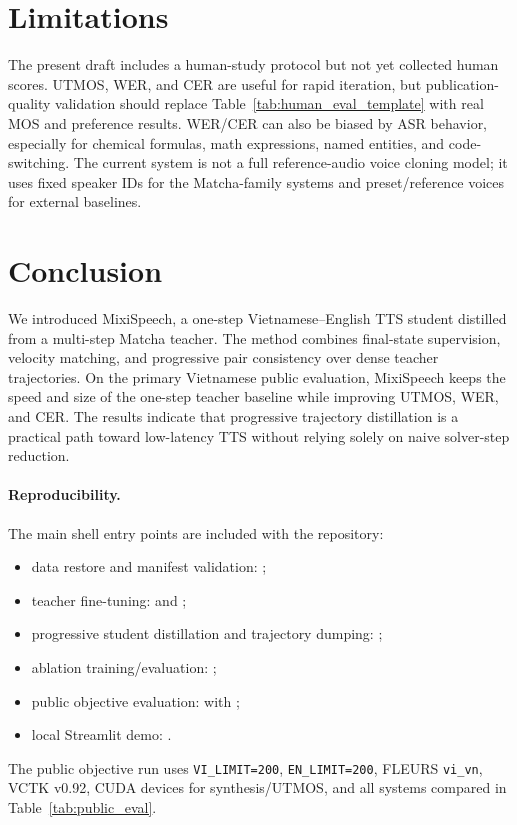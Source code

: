 \documentclass[10pt,twoside]{article}
\newcommand{\method}{MixiSpeech}
\begin{document}
\section{Limitations}

The present draft includes a human-study protocol but not yet collected human
scores. UTMOS, WER, and CER are useful for rapid iteration, but
publication-quality validation should replace Table~\ref{tab:human_eval_template}
with real MOS and preference results. WER/CER can also be biased by ASR behavior,
especially for chemical formulas, math expressions, named entities, and
code-switching. The current system is not a full reference-audio voice cloning
model; it uses fixed speaker IDs for the Matcha-family systems and
preset/reference voices for external baselines.

\section{Conclusion}

We introduced \method, a one-step Vietnamese--English TTS student distilled
from a multi-step Matcha teacher. The method combines final-state supervision,
velocity matching, and progressive pair consistency over dense teacher
trajectories. On the primary Vietnamese public evaluation, \method{} keeps the
speed and size of the one-step teacher baseline while improving UTMOS, WER, and
CER. The results indicate that progressive trajectory distillation is a
practical path toward low-latency TTS without relying solely on naive
solver-step reduction.

\paragraph{Reproducibility.}
The main shell entry points are included with the repository:
\begingroup
\footnotesize
\sloppy
\begin{itemize}[leftmargin=1.5em,itemsep=0.1em,topsep=0.2em]
\item data restore and manifest validation:
;
\item teacher fine-tuning:
 and
;
\item progressive student distillation and trajectory dumping:
;
\item ablation training/evaluation:
;
\item public objective evaluation:
 with
;
\item local Streamlit demo:
.
\end{itemize}
\endgroup
\noindent
The public objective run uses \texttt{VI\_LIMIT=200}, \texttt{EN\_LIMIT=200},
FLEURS \texttt{vi\_vn}, VCTK v0.92, CUDA devices for synthesis/UTMOS, and all
systems compared in Table~\ref{tab:public_eval}.
\end{document}
